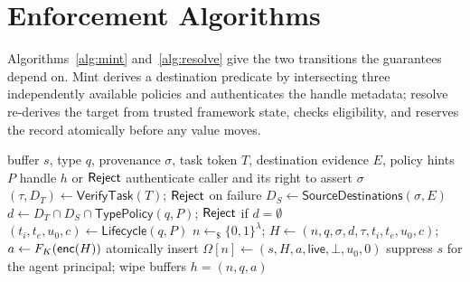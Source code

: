 \section{Enforcement Algorithms}
\label{sec:algorithm}

Algorithms~\ref{alg:mint} and~\ref{alg:resolve} give the two transitions the guarantees depend on. Mint derives a destination predicate by intersecting three independently available policies and authenticates the handle metadata; resolve re-derives the target from trusted framework state, checks eligibility, and reserves the record atomically before any value moves.

\begin{algorithm}[t]
\caption{\SH{} Mint}
\label{alg:mint}
\begin{algorithmic}[1]
\Require buffer $s$, type $q$, provenance $\sigma$, task token $T$, destination evidence $E$, policy hints $P$
\Ensure handle $h$ or $\mathsf{Reject}$
\State authenticate caller and its right to assert $\sigma$
\State $(\tau,D_T)\gets\mathsf{VerifyTask}(T)$; \Return $\mathsf{Reject}$ on failure
\State $D_S\gets\mathsf{SourceDestinations}(\sigma,E)$
\State $d\gets D_T\cap D_S\cap\mathsf{TypePolicy}(q,P)$; \Return $\mathsf{Reject}$ if $d=\emptyset$
\State $(t_i,t_e,u_0,c)\gets\mathsf{Lifecycle}(q,P)$
\State $n\leftarrow_{\$}\{0,1\}^\lambda$; $H\gets(n,q,\sigma,d,\tau,t_i,t_e,u_0,c)$; $a\gets F_K(\mathsf{enc}(H))$
\State atomically insert $\Omega[n]\gets(s,H,a,\mathsf{live},\bot,u_0,0)$
\State suppress $s$ for the agent principal; wipe buffers
\State \Return $h=(n,q,a)$
\end{algorithmic}
\end{algorithm}

